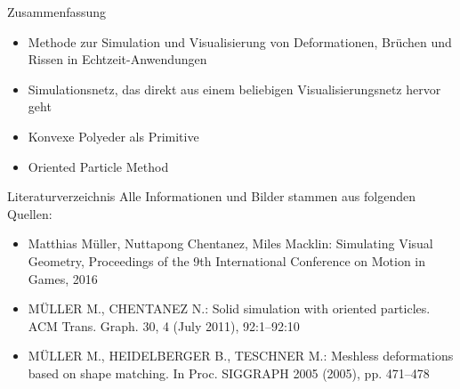 \documentclass[t]{beamer}
\begin{document}
	\begin{frame}{Zusammenfassung}
		\begin{itemize}
			\item Methode zur Simulation und Visualisierung von Deformationen, Brüchen und Rissen in Echtzeit-Anwendungen
			\item Simulationsnetz, das direkt aus einem beliebigen Visualisierungsnetz hervor geht
			\item Konvexe Polyeder als Primitive
			\item Oriented Particle Method
		\end{itemize}
	\end{frame}

	\begin{frame}{Literaturverzeichnis}
		Alle Informationen und Bilder stammen aus folgenden Quellen:
		\begin{itemize}
			\item Matthias Müller, Nuttapong Chentanez, Miles Macklin: Simulating Visual Geometry, Proceedings of the 9th International Conference on Motion in Games, 2016
			\item MÜLLER M., CHENTANEZ N.: Solid simulation with oriented particles. ACM Trans. Graph. 30, 4 (July 2011), 92:1–92:10
			\item MÜLLER M., HEIDELBERGER B., TESCHNER M.: Meshless deformations based on shape matching. In Proc. SIGGRAPH 2005 (2005), pp. 471–478
		\end{itemize}
	\end{frame}
\end{document}
